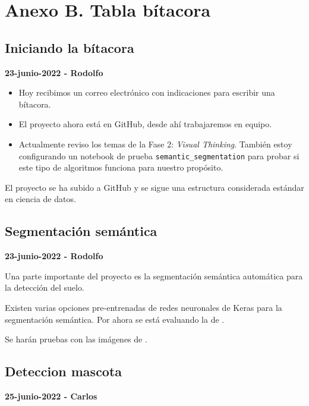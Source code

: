 \section*{Anexo B. Tabla bítacora}


\subsection*{Iniciando la bítacora}

\textbf{23-junio-2022 - Rodolfo}


\begin{itemize}
    \item Hoy recibimos un correo electrónico con indicaciones para escribir una bítacora.
    \item El proyecto ahora está en GitHub, desde ahí trabajaremos en equipo.
    \item Actualmente reviso los temas de la Fase 2: \textit{Visual Thinking}.
     También estoy configurando un notebook de prueba \texttt{semantic\_segmentation} para probar si este tipo de algoritmos funciona para nuestro propósito.
\end{itemize}


El proyecto se ha subido a GitHub y se sigue una estructura considerada estándar en ciencia de datos.

\subsection*{Segmentación semántica}

\textbf{23-junio-2022 - Rodolfo}

Una parte importante del proyecto es la segmentación semántica automática para la detección del suelo.

Existen varias opciones pre-entrenadas de redes neuronales de Keras para la segmentación semántica. Por ahora se está evaluando la de \textcite{gupta2022}.

Se harán pruebas con las imágenes de \textcite{unity2022}.

\subsection*{Deteccion mascota}

\textbf{25-junio-2022 - Carlos}

